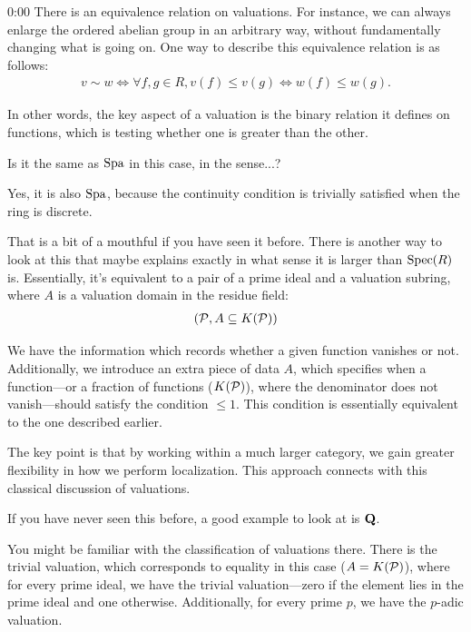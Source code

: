 \begin{unfinished}{0:00}
There is an equivalence relation on valuations. For instance, we can always enlarge the ordered abelian group in an arbitrary way, without fundamentally changing what is going on.
One way to describe this equivalence relation is as follows:
\begin{align*}
v \sim w \iff \forall f, g \in R, v(f) \leq v(g) \iff w(f) \leq w(g).
\end{align*}

In other words, the key aspect of a valuation is the binary relation it defines on functions, which is testing whether one is greater than the other.

\ques Is it the same as $\operatorname{Spa}$ in this case, in the sense...?

\ans Yes, it is also $\operatorname{Spa}$, because the continuity condition is trivially satisfied when the ring is discrete. 

That is a bit of a mouthful if you have seen it before. There is  another way to look at this that maybe explains exactly in what sense it is larger than $\operatorname{Spec}(R)$ is.
Essentially, it's equivalent to a pair of a prime ideal and a valuation subring, where $A$ is a valuation domain in the residue field:
\begin{align*}
(\mathcal P, A \subseteq K(\mathcal P))
\end{align*}

We have the information which records whether a given function vanishes or not. Additionally, we introduce an extra piece of data $A$, which specifies when a function---or a fraction of functions ($K(\mathcal P)$), where the denominator does not vanish---should satisfy the condition $\leq 1$. 
This condition is essentially equivalent to the one described earlier.

The key point is that by working within a much larger category, we gain greater flexibility in how we perform localization. This approach connects with this classical discussion of valuations. 

\begin{example}

If you have never seen this before, a good example to look at is $\mathbf Q$. 

You might be familiar with the classification of valuations there. There is the trivial valuation, which corresponds to equality in this case ($A = K(\mathcal P)$), where for every prime ideal, we have the trivial valuation---zero if the element lies in the prime ideal and one otherwise. Additionally, for every prime $p$, we have the $p$-adic valuation.


\end{example}
\end{unfinished}
